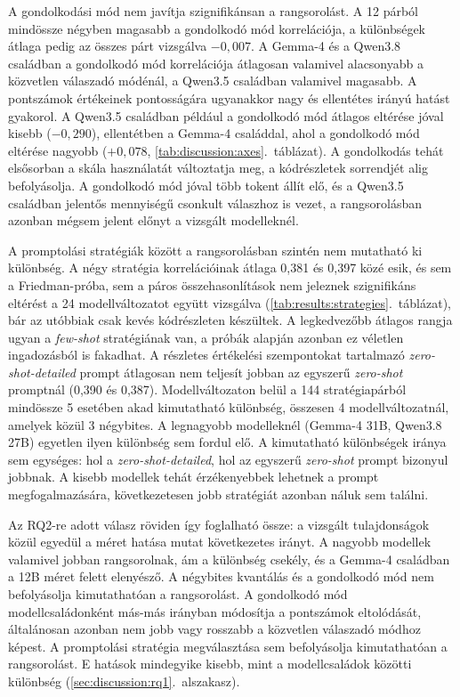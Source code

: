 \documentclass[
]{elteikthesis}[2024/04/26]
\begin{document}
A gondolkodási mód nem javítja szignifikánsan a rangsorolást.
A 12 párból mindössze négyben magasabb a gondolkodó mód korrelációja,
a különbségek átlaga pedig az összes párt vizsgálva $-0{,}007$.
A Gemma-4 és a Qwen3.8 családban a gondolkodó mód korrelációja átlagosan valamivel
alacsonyabb a közvetlen válaszadó módénál, a Qwen3.5 családban valamivel magasabb.
A pontszámok értékeinek pontosságára ugyanakkor nagy és ellentétes irányú hatást gyakorol.
A Qwen3.5 családban például a gondolkodó mód átlagos eltérése jóval kisebb ($-0{,}290$),
ellentétben a Gemma-4 családdal, ahol a gondolkodó mód eltérése nagyobb ($+0{,}078$, \ref{tab:discussion:axes}.~táblázat).
A gondolkodás tehát elsősorban a skála használatát változtatja meg,
a kódrészletek sorrendjét alig befolyásolja.
A gondolkodó mód jóval több tokent állít elő, és a Qwen3.5 családban jelentős mennyiségű csonkult válaszhoz is vezet,
a rangsorolásban azonban mégsem jelent előnyt a vizsgált modelleknél.

A promptolási stratégiák között a rangsorolásban szintén nem mutatható ki különbség.
A négy stratégia korrelációinak átlaga 0,381 és 0,397 közé esik, és sem a Friedman-próba,
sem a páros összehasonlítások nem jeleznek szignifikáns eltérést a 24 modellváltozatot együtt vizsgálva (\ref{tab:results:strategies}.~táblázat),
bár az utóbbiak csak kevés kódrészleten készültek.
A legkedvezőbb átlagos rangja ugyan a \textit{few-shot} stratégiának van,
a próbák alapján azonban ez véletlen ingadozásból is fakadhat.
A részletes értékelési szempontokat tartalmazó \textit{zero-shot-detailed} prompt
átlagosan nem teljesít jobban az egyszerű \textit{zero-shot} promptnál (0,390 és 0,387).
Modellváltozaton belül a 144 stratégiapárból mindössze 5 esetében akad kimutatható különbség,
összesen 4 modellváltozatnál, amelyek közül 3 négybites.
A legnagyobb modelleknél (Gemma-4 31B, Qwen3.8 27B) egyetlen ilyen különbség sem fordul elő.
A kimutatható különbségek iránya sem egységes:
hol a \textit{zero-shot-detailed}, hol az egyszerű \textit{zero-shot} prompt bizonyul jobbnak.
A kisebb modellek tehát érzékenyebbek lehetnek a prompt megfogalmazására,
következetesen jobb stratégiát azonban náluk sem találni.

Az RQ2-re adott válasz röviden így foglalható össze:
a vizsgált tulajdonságok közül egyedül a méret hatása mutat következetes irányt.
A nagyobb modellek valamivel jobban rangsorolnak, ám a különbség csekély,
és a Gemma-4 családban a 12B méret felett elenyésző.
A négybites kvantálás és a gondolkodó mód nem befolyásolja kimutathatóan a rangsorolást.
A gondolkodó mód modellcsaládonként más-más irányban módosítja a pontszámok eltolódását,
általánosan azonban nem jobb vagy rosszabb a közvetlen válaszadó módhoz képest.
A promptolási stratégia megválasztása sem befolyásolja kimutathatóan a rangsorolást.
E hatások mindegyike kisebb, mint a modellcsaládok közötti különbség (\ref{sec:discussion:rq1}.~alszakasz).
\end{document}
